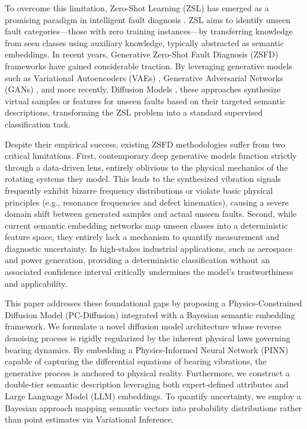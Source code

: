 \documentclass[journal]{IEEEtran}
\begin{document}
To overcome this limitation, Zero-Shot Learning (ZSL) has emerged as a promising paradigm in intelligent fault diagnosis \cite{xian2018zero,pan2009survey}. ZSL aims to identify unseen fault categories—those with zero training instances—by transferring knowledge from seen classes using auxiliary knowledge, typically abstracted as semantic embeddings. In recent years, Generative Zero-Shot Fault Diagnosis (ZSFD) frameworks have gained considerable traction. By leveraging generative models such as Variational Autoencoders (VAEs) \cite{kingma2013auto}, Generative Adversarial Networks (GANs) \cite{goodfellow2014generative}, and more recently, Diffusion Models \cite{ho2020denoising}, these approaches synthesize virtual samples or features for unseen faults based on their targeted semantic descriptions, transforming the ZSL problem into a standard supervised classification task.

Despite their empirical success, existing ZSFD methodologies suffer from two critical limitations. First, contemporary deep generative models function strictly through a data-driven lens, entirely oblivious to the physical mechanics of the rotating systems they model. This leads to the synthesized vibration signals frequently exhibit bizarre frequency distributions or violate basic physical principles (e.g., resonance frequencies and defect kinematics), causing a severe domain shift between generated samples and actual unseen faults. Second, while current semantic embedding networks \cite{schonfeld2019cada} map unseen classes into a deterministic feature space, they entirely lack a mechanism to quantify measurement and diagnostic uncertainty. In high-stakes industrial applications, such as aerospace and power generation, providing a deterministic classification without an associated confidence interval critically undermines the model's trustworthiness and applicability.

This paper addresses these foundational gaps by proposing a Physics-Constrained Diffusion Model (PC-Diffusion) integrated with a Bayesian semantic embedding framework. We formulate a novel diffusion model architecture whose reverse denoising process is rigidly regularized by the inherent physical laws governing bearing dynamics. By embedding a Physics-Informed Neural Network (PINN) capable of capturing the differential equations of bearing vibrations, the generative process is anchored to physical reality. Furthermore, we construct a double-tier semantic description leveraging both expert-defined attributes and Large Language Model (LLM) embeddings. To quantify uncertainty, we employ a Bayesian approach mapping semantic vectors into probability distributions rather than point estimates via Variational Inference. 
\end{document}
